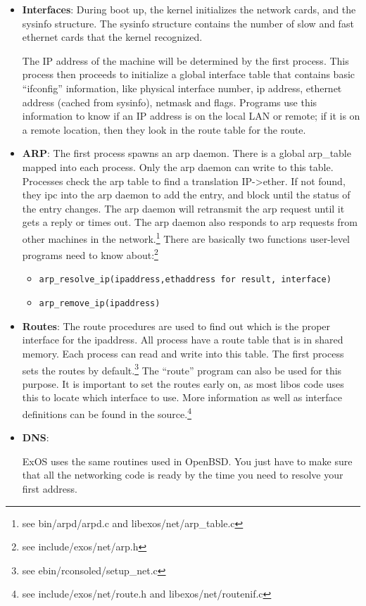 \begin{itemize}

\item{\bf Interfaces}:
During boot up, the kernel initializes the network cards, and
the sysinfo structure.  The sysinfo structure contains the number of
slow and fast ethernet cards that the kernel recognized.  

The IP address of the machine will be determined by the first
process.  This process then proceeds to initialize a global interface
table that contains basic ``ifconfig'' information, like physical
interface number, ip address, ethernet address (cached from sysinfo),
netmask and flags.  Programs use this information to know if an IP
address is on the local LAN or remote; if it is on a remote location,
then they look in the route table for the route.

\item{\bf ARP}: The first process spawns an arp daemon.  There is a global 
arp\_table mapped into each process.  Only the arp daemon can write to
this table.  Processes check the arp table to find a translation
IP->ether. If not found, they ipc into the arp daemon to add the
entry, and block until the status of the entry changes.  The arp
daemon will retransmit the arp request until it gets a reply or times
out.  The arp daemon also responds to arp requests from other machines
in the network.\footnote{see bin/arpd/arpd.c and
libexos/net/arp\_table.c} There are basically two functions user-level
programs need to know about:\footnote{see include/exos/net/arp.h}

\begin{itemize}
\item {\tt arp\_resolve\_ip(ipaddress,ethaddress for result, interface)}
\item {\tt arp\_remove\_ip(ipaddress)}
\end{itemize}

\item{\bf Routes}: The route procedures are used to find out which is the proper
interface for the ipaddress. All process have a route table that is in
shared memory.  Each process can read and write into this table.  The
first process sets the routes by default.\footnote{see
ebin/rconsoled/setup\_net.c} The ``route'' program can also be used
for this purpose.  It is important to set the routes early on, as most
libos code uses this to locate which interface to use. More
information as well as interface definitions can be found in the
source.\footnote{see include/exos/net/route.h and
libexos/net/routenif.c}

\item{\bf DNS}:

ExOS uses the same routines used in OpenBSD.  You just have to make
sure that all the networking code is ready by the time you need to
resolve your first address.

\end{itemize}






